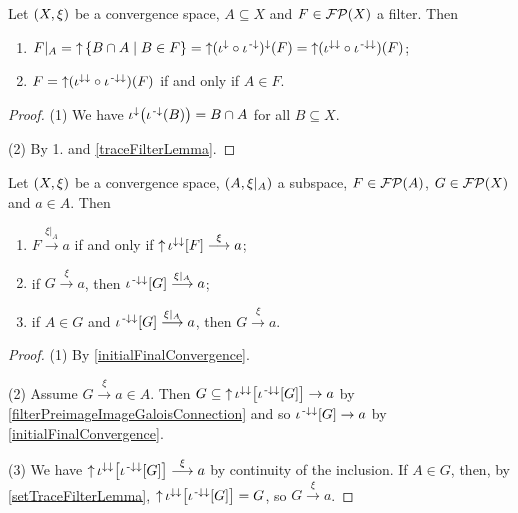 \begin{lemma} \label{setTraceFilterLemma}
Let $\left( X,\xi \right)$ be a convergence space, $A\subseteq X$ and $F\in\operatorname{\mathcal{FP}}(X)$ a filter. Then
\begin{enumerate}
\item $F|_A = \upset \setbuilder{B\cap A}{B\in F} = \upset( \iota^{\imf}\circ \iota^{\preimf})^\imf(F) = \upset(\iota^{\imf\imf}\circ \iota^{\preimf\imf})(F)$;
\item $F = \operatorname{\uparrow}(\iota^{\downarrow\downarrow}\circ \iota^{{\text{\hspace{0.15em}-}\downarrow}\downarrow})(F)$ \textup{if and only if} $A\in F$.
\end{enumerate}
\end{lemma}
\begin{proof}
(1) We have $\iota^{\downarrow}\big(\iota^{{\text{\hspace{0.15em}-}\downarrow}}(B)\big) = B\cap A$ for all $B\subseteq X$.

(2) By 1. and \ref{traceFilterLemma}.
\end{proof}

\begin{lemma} \label{subspaceConvergence}
Let $\left( X,\xi \right)$ be a convergence space, $\left( A,\xi|_A \right)$ a subspace, $F\in \operatorname{\mathcal{FP}}(A)$, $G\in \operatorname{\mathcal{FP}}(X)$ and $a\in A$. Then
\begin{enumerate}
\item $F \overset{\xi|_A}{\longrightarrow} a$ if and only if $\operatorname{\uparrow} \iota^{\downarrow\downarrow}[F] \overset{\xi}{\longrightarrow} a$;
\item if $G\overset{\xi}{\longrightarrow} a$, then $\iota^{{\text{\hspace{0.15em}-}\downarrow}\downarrow}[G]\overset{\xi|_A}{\longrightarrow} a$;
\item if $A\in G$ and $\iota^{{\text{\hspace{0.15em}-}\downarrow}\downarrow}[G]\overset{\xi|_A}{\longrightarrow} a$, then $G\overset{\xi}{\longrightarrow} a$.
\end{enumerate}
\end{lemma}
\begin{proof}
(1) By \ref{initialFinalConvergence}.

(2) Assume $G\overset{\xi}{\longrightarrow} a \in A$. Then $G \subseteq \operatorname{\uparrow}\iota^{\downarrow\downarrow}\big[\iota^{{\text{\hspace{0.15em}-}\downarrow}\downarrow}[G]\big] \to a$ by \ref{filterPreimageImageGaloisConnection} and so $\iota^{{\text{\hspace{0.15em}-}\downarrow}\downarrow}[G] \to a$ by \ref{initialFinalConvergence}.

(3) We have $\operatorname{\uparrow}\iota^{\downarrow\downarrow}\big[\iota^{{\text{\hspace{0.15em}-}\downarrow}\downarrow}[G]\big] \overset{\xi}{\longrightarrow} a$ by continuity of the inclusion. If $A\in G$, then, by \ref{setTraceFilterLemma}, $\operatorname{\uparrow}\iota^{\downarrow\downarrow}\big[\iota^{{\text{\hspace{0.15em}-}\downarrow}\downarrow}[G]\big] = G$, so $G \overset{\xi}{\longrightarrow} a$.
\end{proof}

